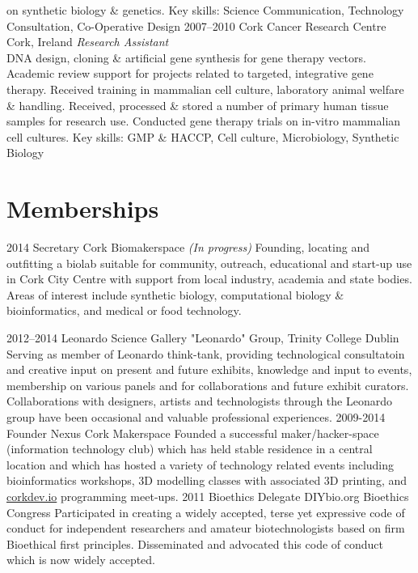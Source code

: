 \documentclass[]{friggeri-cv} %
\begin{document}
\begin{entrylist}
{on synthetic biology \& genetics.
Key skills: Science Communication, Technology Consultation, Co-Operative Design
}
\entry
{2007--2010}
{Cork Cancer Research Centre}
{Cork, Ireland}
{\emph{Research Assistant} \\
DNA design, cloning \& artificial gene synthesis for gene therapy vectors.
Academic review support for projects related to targeted, integrative gene therapy.
Received training in mammalian cell culture, laboratory animal welfare \& handling.
Received, processed \& stored a number of primary human tissue samples for research use.
Conducted gene therapy trials on in-vitro mammalian cell cultures.
Key skills: GMP \& HACCP, Cell culture, Microbiology, Synthetic Biology
}
\end{entrylist}

\pagebreak
\section{Memberships}

\begin{entrylist}
\entry
{2014}
{Secretary}
{Cork Biomakerspace}
{\emph{(In progress)} Founding, locating and outfitting a biolab suitable for
community, outreach, educational and start-up use in Cork City Centre with support
from local industry, academia and state bodies. Areas of interest include synthetic
biology, computational biology \& bioinformatics, and medical or food technology.
}

\entry
{2012--2014}
{Leonardo}
{Science Gallery "Leonardo" Group, Trinity College Dublin}
{Serving as member of Leonardo think-tank, providing technological consultatoin and
creative input on present and future exhibits, knowledge and input to events, membership
on various panels and for collaborations and future exhibit curators.
Collaborations with designers, artists and technologists through the Leonardo group
have been occasional and valuable professional experiences.
}
\entry
{2009-2014}
{Founder}
{Nexus Cork Makerspace}
{Founded a successful maker/hacker-space (information technology club) which has
held stable residence in a central location and which has hosted a variety of
technology related events including bioinformatics workshops, 3D modelling classes
with associated 3D printing, and \href{http://corkdev.io/}{corkdev.io} programming 
meet-ups.
}
\entry
{2011}
{Bioethics Delegate}
{DIYbio.org Bioethics Congress}
{Participated in creating a widely accepted, terse yet expressive code of conduct
for independent researchers and amateur biotechnologists based on firm Bioethical
first principles. Disseminated and advocated this code of conduct which is now
widely accepted.
}
\end{entrylist}
\end{document}
